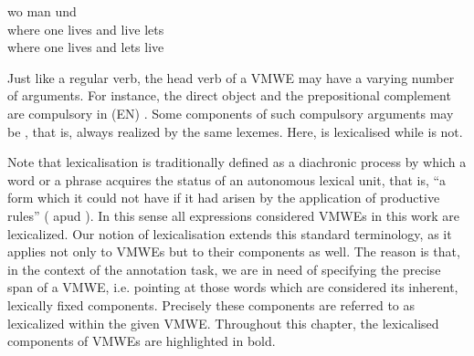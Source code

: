 \documentclass[output=paper,
modfonts,
]{langscibook}
\begin{document}
\ea \label{de:leben-und-leben-lassen}
\settowidth {} 
\gll wo man  und  \\
where one lives and live lets \\ 
\glt where one lives and lets live 
\z


Just like a regular verb, the head verb of a VMWE may have a varying number of arguments. 
For instance, the direct object and the prepositional complement are compulsory in (EN) . Some components of such compulsory arguments may be , that is, always realized by the same lexemes. Here,  is lexicalised while  is not.

Note that lexicalisation is traditionally defined as a diachronic process by which a word or a phrase acquires the status of an autonomous lexical unit, that is, ``a form which it could not have if it had arisen by the application of productive rules'' (\citealt{bauer1983english} apud \citealt{Lipka-et-al:2004}). In this sense all expressions considered VMWEs in this work are lexicalized. 
Our notion of lexicalisation extends this standard terminology, as it applies not only to VMWEs but to their components as well. The reason is that, in the context of the annotation task, we are in need of specifying the precise span of a VMWE, i.e. pointing at those words which are considered its inherent, lexically fixed components. Precisely these components are referred to as lexicalized within the given VMWE. Throughout this chapter, the lexicalised components of VMWEs are highlighted in bold.
\end{document}
